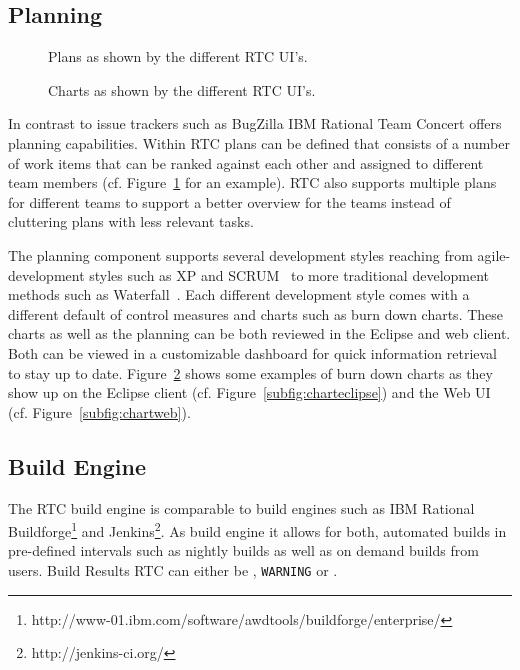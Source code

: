 \subsection{Planning}
\begin{figure}[t]
\centering
{}
\caption{Plans as shown by the different RTC UI's.}
\label{fig:plan}
\end{figure}
\begin{figure}[t]
\centering
{}
\caption{Charts as shown by the different RTC UI's.}
\label{fig:charts}
\end{figure}
In contrast to issue trackers such as BugZilla IBM Rational Team Concert offers planning capabilities.
Within RTC plans can be defined that consists of a number of work items that can be ranked against each other and assigned to different team members (cf.  Figure~\ref{fig:plan} for an example).
RTC also supports multiple plans for different teams to support a better overview for the teams instead of cluttering plans with less relevant tasks.

The planning component supports several development styles reaching from agile-development styles such as XP and SCRUM~\cite{larman:ieeecomputer:2003} to more traditional development methods such as Waterfall~\cite{boehm:senotes:1986}.
Each different development style comes with a different default of control measures and charts such as burn down charts.
These charts as well as the planning can be both reviewed in the Eclipse and web client.
Both can be viewed in a customizable dashboard for quick information retrieval to stay up to date.
Figure~\ref{fig:charts} shows some examples of burn down charts as they show up on the Eclipse client (cf. Figure~\ref{subfig:charteclipse}) and the Web UI (cf. Figure~\ref{subfig:chartweb}).

\subsection{Build Engine}
The RTC build engine is comparable to build engines such as IBM Rational Buildforge\footnote{http://www-01.ibm.com/software/awdtools/buildforge/enterprise/} and Jenkins\footnote{http://jenkins-ci.org/}.
As build engine it allows for both, automated builds in pre-defined intervals such as nightly builds as well as on demand builds from users.
Build Results RTC can either be \error, \texttt{WARNING} or \ok. 


